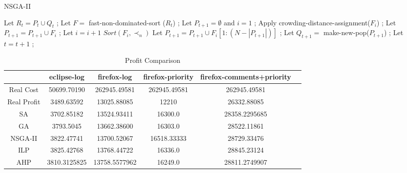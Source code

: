 \begin{algorithm}
\caption{NSGA-II}\label{alg:nsga2}
\begin{algorithmic}
        \State Let $R_t = P_t \cup Q_t$ ;
        \State Let $F = $ fast-non-dominated-sort ($R_t$) ; %
        \State Let $P_{t+1} = \emptyset$ and $i = 1$ ;
            \State Apply crowding-distance-assignment($F_i$) ; %
            \State Let $P_{t+1} = P_{t+1} \cup F_i$ ;
            \State Let $i = i + 1$
        \EndWhile
        \State $Sort(F_i, \prec_n)$
        \State Let $P_{t+1} = P_{t+1} \cup F_i[1:(N - |P_{t+1}|)]$ ;
        \State Let $Q_{t+1} = $ make-new-pop($P_{t+1}$) ;
        \State Let $t = t + 1$ ;
    \EndWhile\label{euclidendwhile}
\end{algorithmic}
\end{algorithm}

\begin{table*}
  \caption{Profit Comparison}
  \label{tab:commands}
  \begin{tabular}{cccccl}
    \toprule
    &eclipse-log&firefox-log&firefox-priority&firefox-comments+priority\\
    \midrule
    Real Cost&50699.70190&262945.49581&262945.49581&262945.49581 \\
    Real Profit&3489.63592&13025.88085&12210&26332.88085 \\
    \hline
    SA&3702.85182&13524.93411&16300.0&28358.2295685 \\
    GA&3793.5045&13662.38600&16303.0&28522.11861 \\
    NSGA-II&3822.47741&13700.52067&16518.33333&28729.33476 \\
    ILP&3825.42768&13768.44722&16336.0&28845.23124 \\
    AHP&3810.3125825&13758.5577962&16249.0&28811.2749907 \\
    \bottomrule
  \end{tabular}
\end{table*}

